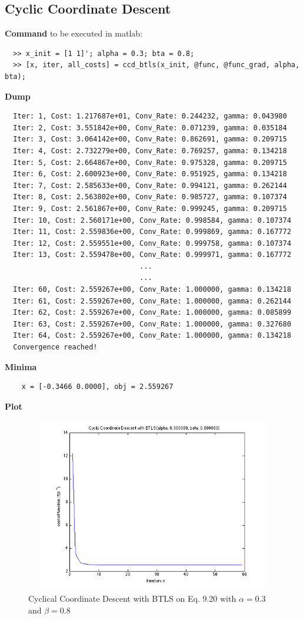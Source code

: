 \documentclass[11pt,a4paper]{article}
\begin{document}
\newpage
\subsection{Cyclic Coordinate Descent}
{\bf Command} to be executed in matlab:
\begin{verbatim}
  >> x_init = [1 1]'; alpha = 0.3; bta = 0.8;
  >> [x, iter, all_costs] = ccd_btls(x_init, @func, @func_grad, alpha, bta);
\end{verbatim}
{\bf Dump}
\begin{verbatim}
  Iter: 1, Cost: 1.217687e+01, Conv_Rate: 0.244232, gamma: 0.043980
  Iter: 2, Cost: 3.551842e+00, Conv_Rate: 0.071239, gamma: 0.035184
  Iter: 3, Cost: 3.064142e+00, Conv_Rate: 0.862691, gamma: 0.209715
  Iter: 4, Cost: 2.732279e+00, Conv_Rate: 0.769257, gamma: 0.134218
  Iter: 5, Cost: 2.664867e+00, Conv_Rate: 0.975328, gamma: 0.209715
  Iter: 6, Cost: 2.600923e+00, Conv_Rate: 0.951925, gamma: 0.134218
  Iter: 7, Cost: 2.585633e+00, Conv_Rate: 0.994121, gamma: 0.262144
  Iter: 8, Cost: 2.563802e+00, Conv_Rate: 0.985727, gamma: 0.107374
  Iter: 9, Cost: 2.561867e+00, Conv_Rate: 0.999245, gamma: 0.209715
  Iter: 10, Cost: 2.560171e+00, Conv_Rate: 0.998584, gamma: 0.107374
  Iter: 11, Cost: 2.559836e+00, Conv_Rate: 0.999869, gamma: 0.167772
  Iter: 12, Cost: 2.559551e+00, Conv_Rate: 0.999758, gamma: 0.107374
  Iter: 13, Cost: 2.559478e+00, Conv_Rate: 0.999971, gamma: 0.167772
                                ...
                                ...
  Iter: 60, Cost: 2.559267e+00, Conv_Rate: 1.000000, gamma: 0.134218
  Iter: 61, Cost: 2.559267e+00, Conv_Rate: 1.000000, gamma: 0.262144
  Iter: 62, Cost: 2.559267e+00, Conv_Rate: 1.000000, gamma: 0.085899
  Iter: 63, Cost: 2.559267e+00, Conv_Rate: 1.000000, gamma: 0.327680
  Iter: 64, Cost: 2.559267e+00, Conv_Rate: 1.000000, gamma: 0.134218
  Convergence reached!
\end{verbatim}
{\bf Minima}
\begin{verbatim}
    x = [-0.3466 0.0000], obj = 2.559267 
   \end{verbatim}
{\bf Plot}
\begin{figure}[h]
    \centering
    \includegraphics[width=5in,height=3in]{../ps2_matlab/4.png}
    \caption{Cyclical Coordinate Descent with BTLS on
        Eq. 9.20 with $\alpha = 0.3$ and $\beta = 0.8$}
\end{figure}
\newpage
\end{document}
